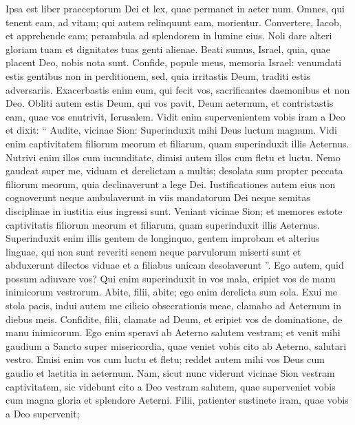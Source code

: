 \begin{biblechapter}
\begin{biblechapter}
\begin{biblechapter}
\begin{biblechapter}
\verse Ipsa est liber praeceptorum Dei
 et lex, quae permanet in aeter num.
 Omnes, qui tenent eam, ad vitam;
 qui autem relinquunt eam, morientur.
 \verse Convertere, Iacob, et apprehende eam;
 perambula ad splendorem in lumine eius.
 \verse Noli dare alteri gloriam tuam
 et dignitates tuas genti alienae.
 \verse Beati sumus, Israel,
 quia, quae placent Deo, nobis nota sunt.
 \verse Confide, popule meus,
 memoria Israel:
 \verse venumdati estis gentibus
 non in perditionem,
 sed, quia irritastis Deum,
 traditi estis adversariis.
 \verse Exacerbastis enim eum, qui fecit vos,
 sacrificantes daemonibus et non Deo.
 \verse Obliti autem estis Deum, qui vos pavit, Deum aeternum,
 et contristastis eam, quae vos enutrivit, Ierusalem.
 \verse Vidit enim supervenientem vobis iram a Deo
 et dixit: “ Audite, vicinae Sion:
 Superinduxit mihi Deus luctum magnum.
 \verse Vidi enim captivitatem filiorum meorum et filiarum,
 quam superinduxit illis Aeternus.
 \verse Nutrivi enim illos cum iucunditate,
 dimisi autem illos cum fletu et luctu.
 \verse Nemo gaudeat super me, viduam et derelictam a multis;
 desolata sum propter peccata filiorum meorum,
 quia declinaverunt a lege Dei.
 \verse Iustificationes autem eius non cognoverunt
 neque ambulaverunt in viis mandatorum Dei
 neque semitas disciplinae in iustitia eius ingressi sunt.
 \verse Veniant vicinae Sion;
 et memores estote captivitatis filiorum meorum et filiarum,
 quam superinduxit illis Aeternus.
 \verse Superinduxit enim illis gentem de longinquo,
 gentem improbam et alterius linguae,
 qui non sunt reveriti senem
 neque parvulorum miserti sunt
 \verse et abduxerunt dilectos viduae
 et a filiabus unicam desolaverunt ”.
 \verse Ego autem, quid possum adiuvare vos?
 \verse Qui enim superinduxit in vos mala,
 eripiet vos de manu inimicorum vestrorum.
 \verse Abite, filii, abite;
 ego enim derelicta sum sola.
 \verse Exui me stola pacis,
 indui autem me cilicio obsecrationis meae,
 clamabo ad Aeternum in diebus meis.
 \verse Confidite, filii, clamate ad Deum,
 et eripiet vos de dominatione, de manu inimicorum.
 \verse Ego enim speravi ab Aeterno salutem vestram;
 et venit mihi gaudium a Sancto
 super misericordia, quae veniet vobis cito
 ab Aeterno, salutari vestro.
 \verse Emisi enim vos cum luctu et fletu;
 reddet autem mihi vos Deus
 cum gaudio et laetitia in aeternum.
 \verse Nam, sicut nunc viderunt vicinae Sion vestram captivitatem,
 sic videbunt cito a Deo vestram salutem,
 quae superveniet vobis cum magna gloria et splendore Aeterni.
 \verse Filii, patienter sustinete iram, quae vobis a Deo supervenit;

\end{biblechapter}
\end{biblechapter}
\end{biblechapter}
\end{biblechapter}
